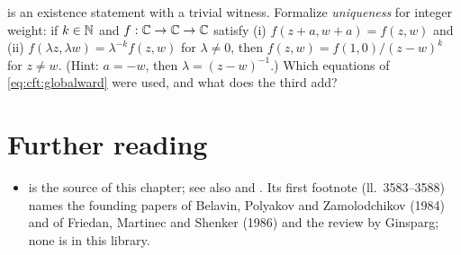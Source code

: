 \begin{exercise}\label{exr:cft:leantwopoint}
 is an existence statement with a trivial witness. Formalize
\emph{uniqueness} for integer weight: if $k\in\mathbb{N}$ and $f:\mathbb{C}\to\mathbb{C}\to\mathbb{C}$ satisfy (i)
$f(z+a,w+a)=f(z,w)$ and (ii) $f(\lambda z,\lambda w)=\lambda^{-k}f(z,w)$ for $\lambda\ne0$, then
$f(z,w)=f(1,0)/(z-w)^{k}$ for $z\ne w$. (Hint: $a=-w$, then $\lambda=(z-w)^{-1}$.) Which
equations of \eqref{eq:cft:globalward} were used, and what does the third add?
\end{exercise}

\section*{Further reading}

\begin{itemize}[leftmargin=*,itemsep=1pt]
\item {} is the source of this chapter; see also
  and . Its first
 footnote (ll.~3583--3588) names the founding papers of Belavin, Polyakov and Zamolodchikov (1984)
 and of Friedan, Martinec and Shenker (1986) and the review by Ginsparg; none is in this library.
\end{itemize}
